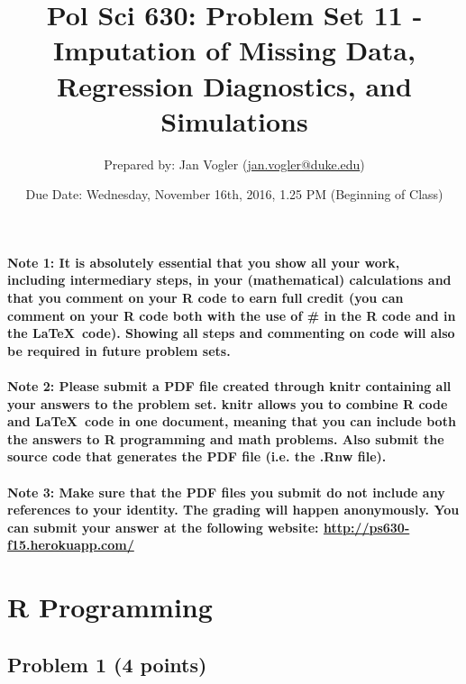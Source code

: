 \documentclass[12pt]{article}
\begin{document}
\title{Pol Sci 630: Problem Set 11 - Imputation of Missing Data, Regression Diagnostics, and Simulations}

\author{Prepared by: Jan Vogler (\href{mailto:jan.vogler@duke.edu}{jan.vogler@duke.edu})}

\date{Due Date: Wednesday, November 16th, 2016, 1.25 PM (Beginning of Class)}
 
\maketitle 



\paragraph{Note 1: It is absolutely essential that you show all your work, including intermediary steps, in your (mathematical) calculations and that you comment on your R code to earn full credit (you can comment on your R code both with the use of \# in the R code and in the \LaTeX \ code). Showing all steps and commenting on code will also be required in future problem sets.}

\paragraph{Note 2: Please submit a PDF file created through knitr containing all your answers to the problem set. knitr allows you to combine R code and \LaTeX \ code in one document, meaning that you can include both the answers to R programming and math problems. Also submit the source code that generates the PDF file (i.e. the .Rnw file).}

\paragraph{Note 3: Make sure that the PDF files you submit do not include any references to your identity. The grading will happen anonymously. You can submit your answer at the following website: \url{http://ps630-f15.herokuapp.com/}}



\section*{R Programming}

\subsection*{Problem 1 (4 points)}
\end{document}
